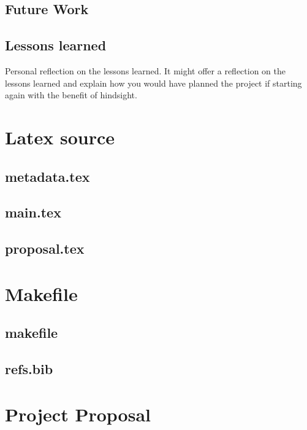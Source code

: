 \documentclass[12pt,a4paper,twoside,openright]{report}
\begin{document}
\section{Future Work}

\section{Lessons learned}
Personal reflection on the lessons learned.
It might offer a reflection on the lessons learned and explain how you would have planned the project if starting again with the benefit of hindsight.





\appendix

\chapter{Latex source}

\section{metadata.tex}
{\scriptsize}

\section{main.tex}
{\scriptsize}

\section{proposal.tex}
{\scriptsize}

\chapter{Makefile}

\section{makefile}\label{makefile}
{\scriptsize}

\section{refs.bib}
{\scriptsize}


\chapter{Project Proposal}


\end{document}
